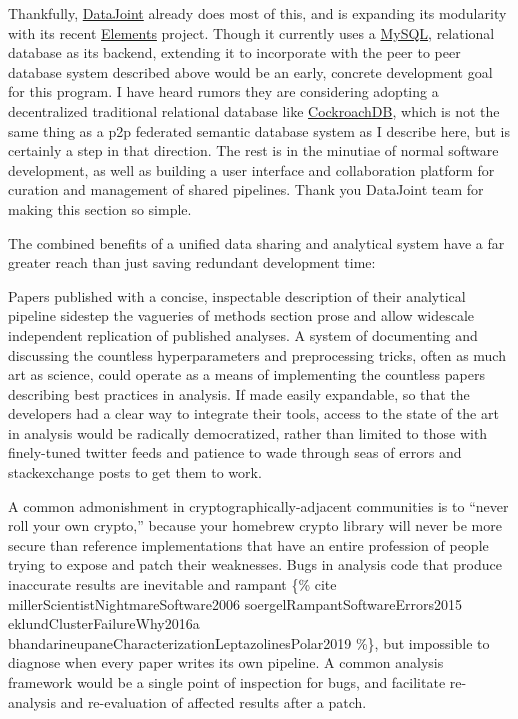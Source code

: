 \documentclass[nohyper]{tufte-book-jls}
\begin{document}
Thankfully, \href{https://datajoint.io/}{DataJoint} already does most of
this, and is expanding its modularity with its recent
\href{https://github.com/datajoint/datajoint-elements}{Elements}
project. Though it currently uses a
\href{https://docs.datajoint.io/python/admin/1-hosting.html}{MySQL},
relational database as its backend, extending it to incorporate with the
peer to peer database system described above would be an early, concrete
development goal for this program. I have heard rumors they are
considering adopting a decentralized traditional relational database
like \href{https://www.cockroachlabs.com/product/}{CockroachDB}, which
is not the same thing as a p2p federated semantic database system as I
describe here, but is certainly a step in that direction. The rest is in
the minutiae of normal software development, as well as building a user
interface and collaboration platform for curation and management of
shared pipelines. Thank you DataJoint team for making this section so
simple.

The combined benefits of a unified data sharing and analytical system
have a far greater reach than just saving redundant development time:

Papers published with a concise, inspectable description of their
analytical pipeline sidestep the vagueries of methods section prose and
allow widescale independent replication of published analyses. A system
of documenting and discussing the countless hyperparameters and
preprocessing tricks, often as much art as science, could operate as a
means of implementing the countless papers describing best practices in
analysis. If made easily expandable, so that the developers had a clear
way to integrate their tools, access to the state of the art in analysis
would be radically democratized, rather than limited to those with
finely-tuned twitter feeds and patience to wade through seas of errors
and stackexchange posts to get them to work.

A common admonishment in cryptographically-adjacent communities is to
``never roll your own crypto,'' because your homebrew crypto library
will never be more secure than reference implementations that have an
entire profession of people trying to expose and patch their weaknesses.
Bugs in analysis code that produce inaccurate results are inevitable and
rampant \{\% cite millerScientistNightmareSoftware2006
soergelRampantSoftwareErrors2015 eklundClusterFailureWhy2016a
bhandarineupaneCharacterizationLeptazolinesPolar2019 \%\}, but
impossible to diagnose when every paper writes its own pipeline. A
common analysis framework would be a single point of inspection for
bugs, and facilitate re-analysis and re-evaluation of affected results
after a patch.
\end{document}
